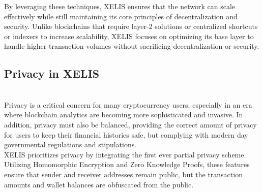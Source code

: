 \documentclass[10pt,a4paper,twocolumn]{article}
\begin{document}
By leveraging these techniques, XELIS ensures that the network can scale effectively while still maintaining its core principles of decentralization and security. Unlike blockchains that require layer-2 solutions or centralized shortcuts or indexers to increase scalability, XELIS focuses on optimizing its base layer to handle higher transaction volumes without sacrificing decentralization or security.\\


\subsection{Privacy in XELIS}\\

Privacy is a critical concern for many cryptocurrency users, especially in an era where blockchain analytics are becoming more sophisticated and invasive. In addition, privacy must also be balanced, providing the correct amount of privacy for users to keep their financial histories safe, but complying with modern day governmental regulations and stipulations.\\

XELIS prioritizes privacy by integrating the first ever partial privacy scheme. Utilizing Homomorphic Encryption and Zero Knowledge Proofs, these features ensure that sender and receiver addresses remain public, but the transaction amounts and wallet balances are obfuscated from the public.\\
\end{document}
